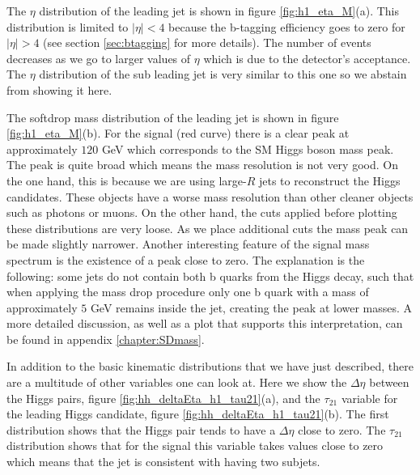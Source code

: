 The $\eta$ distribution of the leading jet is shown in figure \ref{fig:h1_eta_M}(a). This distribution is limited to $|\eta|<4$ because the b-tagging efficiency goes to zero for $|\eta|>4$ (see section \ref{sec:btagging} for more details). The number of events decreases as we go to larger values of $\eta$ which is due to the detector's acceptance. The $\eta$ distribution of the sub leading jet is very similar to this one so we abstain from showing it here.

The softdrop mass distribution of the leading jet is shown in figure \ref{fig:h1_eta_M}(b). For the signal (red curve) there is a clear peak at approximately $120$ GeV which corresponds to the SM Higgs boson mass peak. The peak is quite broad which means the mass resolution is not very good. On the one hand, this is because we are using large-$R$ jets to reconstruct the Higgs candidates. These objects have a worse mass resolution than other cleaner objects such as photons or muons.  On the other hand, the cuts applied before plotting these distributions are very loose. As we place additional cuts the mass peak can be made slightly narrower. Another interesting feature of the signal mass spectrum is the existence of a peak close to zero. The explanation is the following: some jets do not contain both b quarks from the Higgs decay, such that when applying the mass drop procedure only one b quark with a mass of approximately $5$ GeV remains inside the jet, creating the peak at lower masses. A more detailed discussion, as well as a plot that supports this interpretation, can be found in appendix \ref{chapter:SDmass}.

In addition to the basic kinematic distributions that we have just described, there are a multitude of other variables one can look at. Here we show the $\Delta\eta$ between the Higgs pairs, figure \ref{fig:hh_deltaEta_h1_tau21}(a), and the $\tau_{21}$ variable for the leading Higgs candidate, figure \ref{fig:hh_deltaEta_h1_tau21}(b). The first distribution shows that the Higgs pair tends to have a $\Delta\eta$ close to zero. The $\tau_{21}$ distribution shows that for the signal this variable takes values close to zero which means that the jet is consistent with having two subjets.

